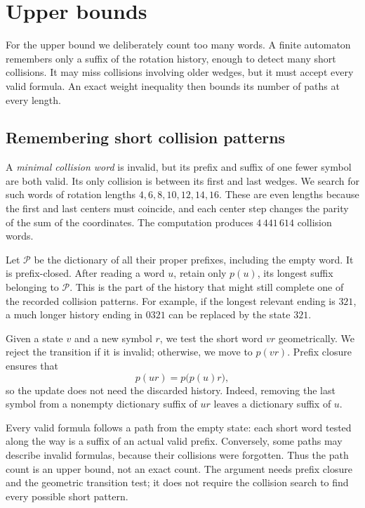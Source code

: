 \documentclass[11pt]{article}
\begin{document}
\section{Upper bounds}\label{sec:upper}

For the upper bound we deliberately count too many words. A finite
automaton remembers only a suffix of the rotation history, enough
to detect many short collisions. It may miss collisions involving
older wedges, but it must accept every valid formula. An exact
weight inequality then bounds its number of paths at every length.

\subsection{Remembering short collision patterns}

A \emph{minimal collision word} is invalid, but its prefix and suffix
of one fewer symbol are both valid. Its only collision is between
its first and last wedges. We search for such words of rotation
lengths $4,6,8,10,12,14,16$. These are even lengths because the
first and last centers must coincide, and each center step changes
the parity of the sum of the coordinates.
The computation produces $4\,441\,614$ collision words.

Let $\mathcal P$ be the dictionary of all their proper prefixes,
including the empty word. It is prefix-closed. After reading a
word $u$, retain only $p(u)$, its longest suffix belonging to
$\mathcal P$. This is the part of the history that might still
complete one of the recorded collision patterns.
For example, if the longest relevant ending is $321$, a much
longer history ending in $0321$ can be replaced by the state $321$.

Given a state $v$ and a new symbol $r$, we test the short word $vr$
geometrically. We reject the transition if it is invalid; otherwise,
we move to $p(vr)$. Prefix closure ensures that
\[
 p(ur)=p\bigl(p(u)r\bigr),
\]
so the update does not need the discarded history.
Indeed, removing the last symbol from a nonempty dictionary suffix
of $ur$ leaves a dictionary suffix of $u$.

Every valid formula follows a path from the empty state:
each short word tested along the way is a suffix of an actual
valid prefix. Conversely, some paths may describe invalid formulas,
because their collisions were forgotten. Thus the path count is
an upper bound, not an exact count. The argument needs prefix
closure and the geometric transition test; it does not require the
collision search to find every possible short pattern.
\end{document}
